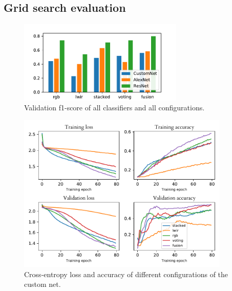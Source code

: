 \documentclass{l4proj}
\begin{document}
\begin{appendices}

\chapter{Grid search evaluation}
\label{appendix_grid_search}

\begin{figure}[ht]
  \centering
  \includegraphics[width=0.7\textwidth]{images/evaluation/gridsearch/comparison}
  \caption{Validation f1-score of all classifiers and all configurations.}
  \label{fig:gridsearch_bar}
\end{figure}

\begin{figure}[ht]
  \centering
  \includegraphics[width=0.9\textwidth]{images/evaluation/gridsearch/CustomNet}
  \caption{Cross-entropy loss and accuracy of different configurations of the custom net.}
  \label{fig:customnet_configs}
\end{figure}


\end{appendices}
\end{document}
